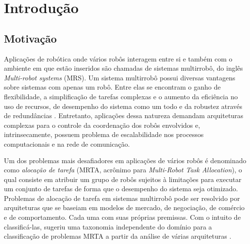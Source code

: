 \chapter[Introdução]{Introdução}

    \section{Motivação}
        Aplicações de robótica onde vários robôs interagem entre si e também com o ambiente em que estão inseridos são chamadas de sistemas multirrobô, do inglês \textit{Multi-robot systems} (MRS). Um sistema multirrobô possui diversas vantagens sobre sistemas com apenas um robô. Entre elas se encontram o ganho de flexibilidade, a simplificação de tarefas complexas e o aumento da eficiência no uso de recursos, de desempenho do sistema como um todo e da robustez através de redundâncias \cite{ref:cao1997cooperative, ref:dudek1996taxonomy, ref:zlot2002multi}. Entretanto, aplicações dessa natureza demandam arquiteturas complexas para o controle da coordenação dos robôs envolvidos e, intrinsecamente, possuem problema de escalabilidade nos processos computacionais e na rede de comunicação. 
        
        Um dos problemas mais desafiadores em aplicações de vários robôs é denominado como \textit{alocação de tarefa} (MRTA, acrônimo para \textit{Multi-Robot Task Allocation}), o qual consiste em atribuir um grupo de robôs sujeitos à limitações para executar um conjunto de tarefas de forma que o desempenho do sistema seja otimizado. Problemas de alocação de tarefa em sistemas multirrobô pode ser resolvido por arquiteturas que se baseiam em modelos de mercado, de negociação, de comércio e de comportamento. Cada uma com suas próprias premissas. Com o intuito de classificá-las,  sugeriu uma taxonomia independente do domínio para a classificação de problemas MRTA a partir da análise de várias arquiteturas \cite{ref:parker1998alliance, ref:gerkey2002murdoch, ref:botelho1999m+, ref:werger2000ble, ref:frank2005kuhn, ref:stentz1999fpo, ref:chaimowicz2002dra}. 
        
